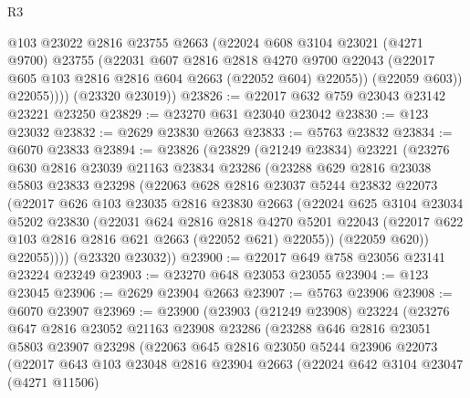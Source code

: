 \begin{lexlean}{R3}
\begin{coremodule}
              @103
              @23022
              @2816
              @23755
              @2663
              (@22024
                @608
                @3104
                @23021
                (@4271 @9700)
                @23755
                (@22031
                  @607
                  @2816
                  @2818
                  @4270
                  @9700
                  @22043
                  (@22017 @605 @103 @2816 @2816 @604 @2663 (@22052 @604) @22055))
                (@22059 @603))
              @22055))))
      (@23320 @23019))
@23826 := @22017 @632 @759 @23043 @23142 @23221 @23250
@23829 := @23270 @631 @23040 @23042
@23830 := @123 @23032
@23832 := @2629 @23830 @2663
@23833 := @5763 @23832
@23834 := @6070 @23833
@23894 := @23826
    (@23829
      (@21249 @23834)
      @23221
      (@23276
        @630
        @2816
        @23039
        @21163
        @23834
        @23286
        (@23288
          @629
          @2816
          @23038
          @5803
          @23833
          @23298
          (@22063
            @628
            @2816
            @23037
            @5244
            @23832
            @22073
            (@22017
              @626
              @103
              @23035
              @2816
              @23830
              @2663
              (@22024
                @625
                @3104
                @23034
                @5202
                @23830
                (@22031
                  @624
                  @2816
                  @2818
                  @4270
                  @5201
                  @22043
                  (@22017 @622 @103 @2816 @2816 @621 @2663 (@22052 @621) @22055))
                (@22059 @620))
              @22055))))
      (@23320 @23032))
@23900 := @22017 @649 @758 @23056 @23141 @23224 @23249
@23903 := @23270 @648 @23053 @23055
@23904 := @123 @23045
@23906 := @2629 @23904 @2663
@23907 := @5763 @23906
@23908 := @6070 @23907
@23969 := @23900
    (@23903
      (@21249 @23908)
      @23224
      (@23276
        @647
        @2816
        @23052
        @21163
        @23908
        @23286
        (@23288
          @646
          @2816
          @23051
          @5803
          @23907
          @23298
          (@22063
            @645
            @2816
            @23050
            @5244
            @23906
            @22073
            (@22017
              @643
              @103
              @23048
              @2816
              @23904
              @2663
              (@22024
                @642
                @3104
                @23047
                (@4271 @11506)

\end{coremodule}
\end{lexlean}
